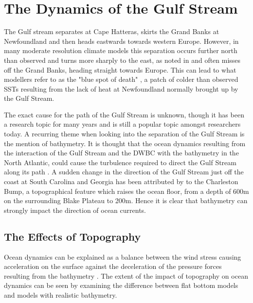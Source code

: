\documentclass[..\report.tex]{subfiles}
\begin{document}
\section{The Dynamics of the Gulf Stream}
\label{SEC:DynamicsGulfStream}

The Gulf stream separates at Cape Hatteras, skirts the Grand Banks at Newfoundland and then heads eastwards towards western Europe. However, in many moderate resolution climate models this separation occurs further north than observed and turns more sharply to the east, as noted in \citep{Hurlburt2008} and often misses off the Grand Banks, heading straight towards Europe. This can lead to what modellers refer to as the "blue spot of death" \citep{Gnanadesikan2007}, a patch of colder than observed \glspl{SST} resulting from the lack of heat at Newfoundland normally brought up by the Gulf Stream.

The exact cause for the path of the Gulf Stream is unknown, though it has been a research topic for many years and is still a popular topic amongst researchers today. A recurring theme when looking into the separation of the Gulf Stream is the mention of bathymetry. It is thought that the ocean dynamics resulting from the interaction of the Gulf Stream and the \gls{DWBC} with the bathymetry in the North Atlantic, could cause the turbulence required to direct the Gulf Stream along its path \citep{Gula2014,NaveiraGarabato2013,Nikurashin2012a}. A sudden change in the direction of the Gulf Stream just off the coast at South Carolina and Georgia has been attributed by \citep{Gula2014} to the Charleston Bump, a topographical feature which raises the ocean floor, from a depth of 600m on the surrounding Blake Plateau to 200m. Hence it is clear that bathymetry can strongly impact the direction of ocean currents.



\subsection{The Effects of Topography}
\label{SSEC:EffectsOfTopography}

Ocean dynamics can be explained as a balance between the wind stress causing acceleration on the surface against the deceleration of the pressure forces resulting from the bathymetry \citep{NaveiraGarabato2013}.
The extent of the impact of topography on ocean dynamics can be seen by examining the difference between flat bottom models and models with realistic bathymetry.
\end{document}
